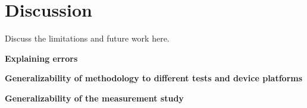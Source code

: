 \section{Discussion}
Discuss the limitations and future work here.

\textbf{Explaining errors}

\textbf{Generalizability of methodology to different tests and device platforms}

\textbf{Generalizability of the measurement study}